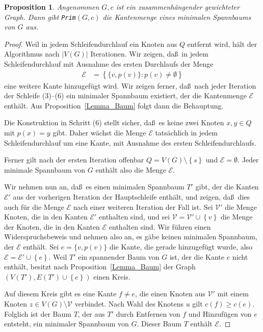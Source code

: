 \documentclass[10pt,reqno]{amsart}
\numberwithin{equation}{section}
\newcommand\cE{\mathcal E}
\newcommand\cV{\mathcal V}
\newtheorem{proposition}[definition]{Proposition}
\newcommand\cbc[1]{\left\{{#1}\right\}}
\newcommand\Prop{Proposition}
\begin{document}
\begin{proposition}\label{prop_prim}
	Angenommen $G,c$ ist ein zusammenh\"angender gewichteter Graph.
	Dann gibt {\tt Prim}$(G,c)$ die Kantenmenge eines minimalen Spannbaums von $G$ aus.
\end{proposition}
\begin{proof}
	Weil in jedem Schleifendurchlauf ein Knoten aus $Q$ entfernt wird, h\"alt der Algorithmus nach $|V(G)|$ Iterationen.
	Wir zeigen, da\ss\ in jedem Schleifendurchlauf mit Ausnahme des ersten Durchlaufs der Menge 
\begin{align*}
		\cE&=\cbc{\{v,p(v)\}:p(v)\neq\emptyset}
	\end{align*}
eine weitere Kante hinzugef\"ugt wird.
	Wir zeigen ferner, da\ss\ nach jeder Iteration der Schleife (3)--(6) ein minimaler Spannbaum existiert, der die Kantenmenge $\cE$
	enth\"alt.
	Aus \Prop~\ref{Lemma_Baum} folgt dann die Behauptung.

	Die Konstruktion in Schritt (6) stellt sicher, da\ss\ es keine zwei Knoten $x,y\in Q$ mit $p(x)=y$ gibt.
	Daher w\"achst die Menge $\cE$ tats\"achlich in jedem Schleifendurchlauf um eine Kante, mit Ausnahme des ersten Schleifendurchlaufs.

	Ferner gilt nach der ersten Iteration offenbar $Q=V(G)\setminus\cbc s$ und $\cE=\emptyset$.
	Jeder minimale Spannbaum von $G$ enth\"alt also die Menge $\cE$.
	
	Wir nehmen nun an, da\ss\ es einen minimalen Spannbaum $T'$ gibt, der die Kanten $\cE'$ aus der vorherigen Iteration der Hauptschleife enth\"alt, und zeigen, da\ss\ dies auch f\"ur die Menge $\cE$ nach einer weiteren Iteration der Fall ist.
	Sei $\cV'$ die Menge Knoten, die in den Kanten $\cE'$ enthalten sind, und sei $\cV=\cV'\cup\cbc v$ die Menge der Knoten, die in den Kanten $\cE$ enthalten sind.
	Wir f\"uhren einen Widerspruchsbeweis und nehmen also an, es g\"abe keinen minimalen Spannbaum, der $\cE$ enth\"alt.
	Sei $e=\{v,p(v)\}$ die Kante, die gerade hinzugef\"ugt wurde, also $\cE=\cE'\cup\cbc e$.
	Weil $T'$ ein spannender Baum von $G$ ist, der die Kante $e$ nicht enth\"alt, besitzt nach \Prop~\ref{Lemma_Baum} der Graph $(V(T'),E(T')\cup\cbc e)$ einen Kreis.

	Auf diesem Kreis gibt es eine Kante $f\neq e$, die einen Knoten aus $\cV'$ mit einem Knoten $z\in V(G)\setminus\cV$ verbindet.
	Nach Wahl des Knotens $u$ gilt $c(f)\geq c(e)$.
	Folglich ist der Baum $T$, der aus $T'$ durch Entfernen von $f$ und Hinzuf\"ugen von $e$ entsteht, ein minimaler Spannbaum von $G$.
	Dieser Baum $T$ enth\"alt $\cE$.
\end{proof}
\end{document}
